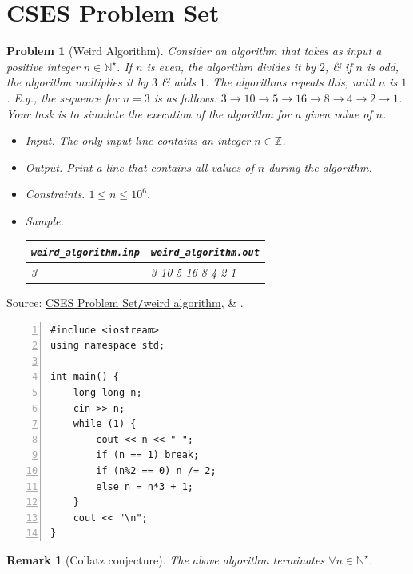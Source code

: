 \documentclass{article}
\newtheorem{problem}{Problem}
\newtheorem{remark}{Remark}
\begin{document}

\section{CSES Problem Set}

\begin{problem}[Weird Algorithm]
	Consider an algorithm that takes as input a positive integer $n\in\mathbb{N}^\star$. If $n$ is even, the algorithm divides it by $2$, \& if $n$ is odd, the algorithm multiplies it by $3$ \& adds $1$. The algorithms repeats this, until $n$ is $1$. E.g., the sequence for $n = 3$ is as follows: $3\to10\to5\to16\to8\to4\to2\to1$. Your task is to simulate the execution of the algorithm for a given value of $n$.
	\begin{itemize}
		\item {\sf Input.} The only input line contains an integer $n\in\mathbb{Z}$.
		\item {\sf Output.} Print a line that contains all values of $n$ during the algorithm.
		\item {\sf Constraints.} $1\le n\le10^6$.
		\item {\sf Sample.}
		\begin{table}[H]
			\centering
			\begin{tabular}{|l|l|}
				\hline
				\verb|weird_algorithm.inp| & \verb|weird_algorithm.out| \\
				\hline
				3 & 3 10 5 16 8 4 2 1 \\
				\hline
			\end{tabular}
		\end{table}
	\end{itemize}
\end{problem}
Source: \href{https://cses.fi/problemset/task/1068}{CSES Problem Set{\tt /}weird algorithm}, \& \cite[Sect. 1.3, pp. 5--7]{Laaksonen2020}.

\begin{Verbatim}[numbers=left,xleftmargin=5mm]
#include <iostream>
using namespace std;

int main() {
    long long n;
    cin >> n;
    while (1) {
        cout << n << " ";
        if (n == 1) break;
        if (n%2 == 0) n /= 2;
        else n = n*3 + 1;
    }
    cout << "\n";
}
\end{Verbatim}

\begin{remark}[Collatz conjecture]
	The above algorithm terminates $\forall n\in\mathbb{N}^\star$.
\end{remark}
\end{document}
